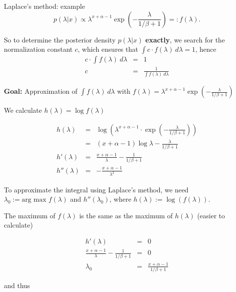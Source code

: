 \begin{vbframe}{Laplace's method: example}
$$
p(\lambda | x) \propto \lambda^{x + \alpha - 1} \exp\left(- \frac{\lambda}{1 / \beta + 1}\right) =: f(\lambda).
$$

So to determine the posterior density $p(\lambda|x)$ \textbf{exactly}, we search for the normalization constant $c$, which ensures that $\int c \cdot f(\lambda) ~d\lambda = 1$, hence
\vspace*{-0.3cm}
\begin{eqnarray*}
c \cdot \int f(\lambda) ~ d\lambda &=& 1 \\
c  &=& \frac{1}{\int f(\lambda)~d\lambda}
\end{eqnarray*}

\framebreak

\textbf{Goal:} Approximation of $\int f(\lambda)~d\lambda$ with $f(\lambda) = \lambda^{x + \alpha - 1} \exp\left(- \frac{\lambda}{1 / \beta + 1}\right)$

\lz

We calculate $h(\lambda) = \log f(\lambda)$

\vspace*{-0.5cm}
\begin{eqnarray*}
h(\lambda) &=& \log \left(\lambda^{x + \alpha - 1}\cdot\exp(-\frac{\lambda}{1 / \beta + 1}) \right) \\
&=& \left({x} + \alpha - 1\right) \log \lambda - \frac{\lambda}{1 / \beta + 1} \\
h'(\lambda) &=& \frac{x + \alpha - 1}{\lambda} - \frac{1}{1 / \beta + 1} \\
h''(\lambda) &=& - \frac{x + \alpha - 1}{\lambda^2}
\end{eqnarray*}

\framebreak

To approximate the integral using Laplace's method, we need $\lambda_0 := \text{arg max } f(\lambda)$ and $h''(\lambda_0)$, where $h(\lambda) := \log (f(\lambda))$.

\lz

The maximum of $f(\lambda)$ is the same as the maximum of $h(\lambda)$ (easier to calculate)

\vspace*{-0.5cm}
\begin{eqnarray*}
h'(\lambda) &=& 0\\
\frac{x + \alpha - 1}{\lambda} - \frac{1}{1 / \beta + 1} &=& 0 \\
\lambda_0 &=& \frac{x + \alpha - 1}{1 / \beta + 1}
\end{eqnarray*}

and thus


\end{vbframe}
